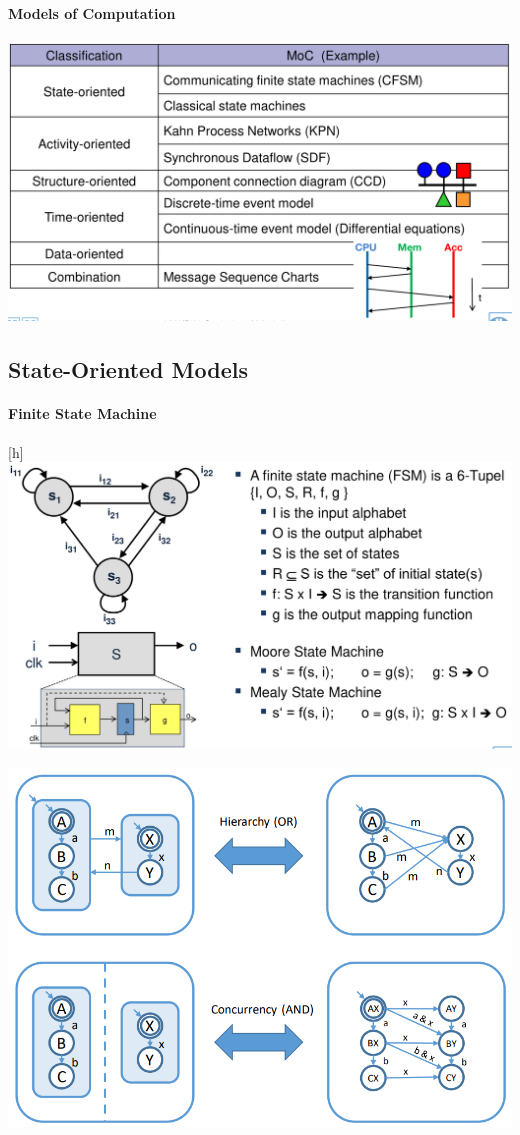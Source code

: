 \documentclass[english]{latex4ei/latex4ei_sheet}
\begin{document}
\paragraph{Models of Computation}

\begin{center}
  \includegraphics[width=0.8\linewidth]{assets/ModelsOfComputation.png}
\end{center}

\subsection{State-Oriented Models}

\paragraph{Finite State Machine}

\begin{center}[h]
  \includegraphics[width=0.8\linewidth]{assets/FiniteStateMachine.png}
  \label{fig:finitestatemachine}
\end{center}


\begin{center}
  \includegraphics[width=0.8\linewidth]{assets/FSMTut.png}
  \label{fig:fsmtut}
\end{center}
\end{document}
